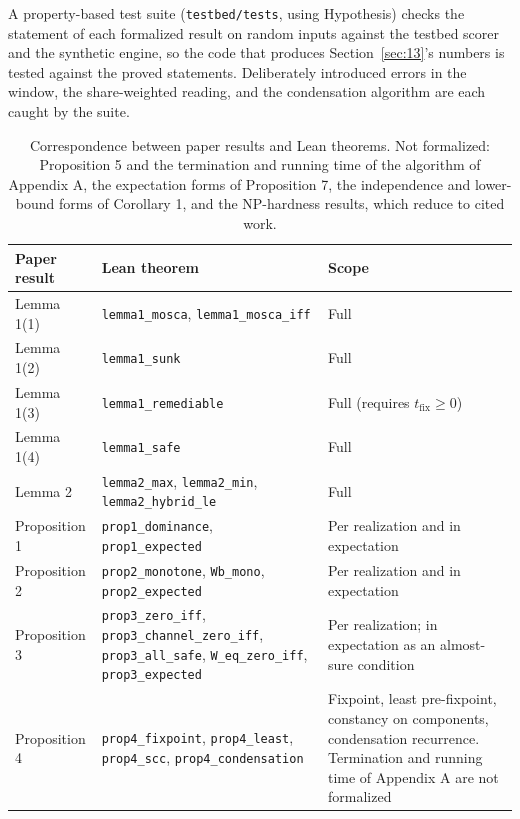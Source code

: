 \documentclass[conference]{IEEEtran}
\newcommand{\tfix}{t_{\mathrm{fix}}}
\begin{document}
A property-based test suite (\texttt{testbed/tests}, using Hypothesis) checks the statement of each formalized result on random inputs against the testbed scorer and the synthetic engine, so the code that produces Section~\ref{sec:13}'s numbers is tested against the proved statements. Deliberately introduced errors in the window, the share-weighted reading, and the condensation algorithm are each caught by the suite.
\begin{table}[!t]
\centering\footnotesize
\caption{Correspondence between paper results and Lean theorems. Not formalized: Proposition 5 and the termination and running time of the algorithm of Appendix A, the expectation forms of Proposition 7, the independence and lower-bound forms of Corollary 1, and the NP-hardness results, which reduce to cited work.}\label{tab:13}
\begin{tabularx}{\linewidth}{>{\raggedright\arraybackslash}X>{\raggedright\arraybackslash}X>{\raggedright\arraybackslash}X}
\toprule
\textbf{Paper result} & \textbf{Lean theorem} & \textbf{Scope} \\ \midrule
Lemma 1(1) & \texttt{lemma1\_\allowbreak{}mosca}, \texttt{lemma1\_\allowbreak{}mosca\_\allowbreak{}iff} & Full \\
Lemma 1(2) & \texttt{lemma1\_\allowbreak{}sunk} & Full \\
Lemma 1(3) & \texttt{lemma1\_\allowbreak{}remediable} & Full (requires $\tfix \ge 0$) \\
Lemma 1(4) & \texttt{lemma1\_\allowbreak{}safe} & Full \\
Lemma 2 & \texttt{lemma2\_\allowbreak{}max}, \texttt{lemma2\_\allowbreak{}min}, \texttt{lemma2\_\allowbreak{}hybrid\_\allowbreak{}le} & Full \\
Proposition 1 & \texttt{prop1\_\allowbreak{}dominance}, \texttt{prop1\_\allowbreak{}expected} & Per realization and in expectation \\
Proposition 2 & \texttt{prop2\_\allowbreak{}monotone}, \texttt{Wb\_\allowbreak{}mono}, \texttt{prop2\_\allowbreak{}expected} & Per realization and in expectation \\
Proposition 3 & \texttt{prop3\_\allowbreak{}zero\_\allowbreak{}iff}, \texttt{prop3\_\allowbreak{}channel\_\allowbreak{}zero\_\allowbreak{}iff}, \texttt{prop3\_\allowbreak{}all\_\allowbreak{}safe}, \texttt{W\_\allowbreak{}eq\_\allowbreak{}zero\_\allowbreak{}iff}, \texttt{prop3\_\allowbreak{}expected} & Per realization; in expectation as an almost-sure condition \\
Proposition 4 & \texttt{prop4\_\allowbreak{}fixpoint}, \texttt{prop4\_\allowbreak{}least}, \texttt{prop4\_\allowbreak{}scc}, \texttt{prop4\_\allowbreak{}condensation} & Fixpoint, least pre-fixpoint, constancy on components, condensation recurrence. Termination and running time of Appendix A are not formalized \\

\end{tabularx}
\end{table}
\end{document}
